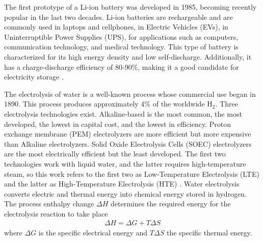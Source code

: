 \documentclass{anstrans}
\begin{document}
The first prototype of a Li-ion battery was developed in 1985, becoming recently popular in the last two decades.
Li-ion batteries are rechargeable and are commonly used in laptops and cellphones, in Electric Vehicles (EVs), in Uninterruptible Power Supplies (UPS), for applications such as computers, communication technology, and medical technology.
This type of battery is characterized for its high energy density and low self-discharge.
Additionally, it has a charge-discharge efficiency of 80-90\%, making it a good candidate for electricity storage \cite{sun_car_2010}.

The electrolysis of water is a well-known process whose commercial use began in 1890.
This process produces approximately 4\% of the worldwide H$_2$.
Three electrolysis technologies exist.
Alkaline-based is the most common, the most developed, the lowest in capital cost, and the lowest in efficiency.
Proton exchange membrane (PEM) electrolyzers are more efficient but more expensive than Alkaline electrolyzers.
Solid Oxide Electrolysis Cells (SOEC) electrolyzers are the most electrically efficient but the least developed.
The first two technologies work with liquid water, and the latter requires high-temperature steam, so this work refers to the first two as Low-Temperature Electrolysis (LTE) and the latter as High-Temperature Electrolysis (HTE) \cite{fairhurst-agosta_multi-physics_2020}.
Water electrolysis converts electric and thermal energy into chemical energy stored in hydrogen.
The process enthalpy change $\Delta H$ determines the required energy for the electrolysis reaction to take place
\begin{align}
  \Delta H = \Delta G + T \Delta S
\end{align}
where $\Delta G$ is the specific electrical energy and $T \Delta S$ the specific thermal energy.





\end{document}
